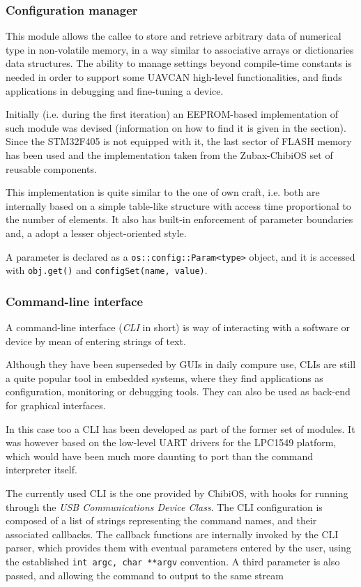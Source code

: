 \subsubsection{Configuration manager}
This module allows the callee to store and retrieve arbitrary data of numerical type in non-volatile memory, in a way similar to associative arrays or dictionaries data structures.
The ability to manage settings beyond compile-time constants is needed in order to support some UAVCAN high-level functionalities, and finds applications in debugging and fine-tuning a device.

Initially (i.e. during the first iteration) an EEPROM-based implementation of such module was devised (information on how to find it is given in the  section).
Since the STM32F405 is not equipped with it, the last sector of FLASH memory has been used and the implementation taken from the Zubax-ChibiOS set of reusable components.

This implementation is quite similar to the one of own craft, i.e. both are internally based on a simple table-like structure with access time proportional to the number of elements.
It also has built-in enforcement of parameter boundaries and, a adopt a lesser object-oriented style.

A parameter is declared as a \texttt{os::config::Param<type>} object, and it is accessed with \texttt{obj.get()} and \texttt{configSet(name, value)}.


\subsubsection{Command-line interface}
A command-line interface (\emph{CLI} in short) is way of interacting with a software or device by mean of entering strings of text.

Although they have been superseded by GUIs in daily compure use, CLIs are still a quite popular tool in embedded systems, where they find applications as configuration, monitoring or debugging tools.
They can also be used as back-end for graphical interfaces.

In this case too a CLI has been developed as part of the former set of modules.
It was however based on the low-level UART drivers for the LPC1549 platform, which would have been much more daunting to port than the command interpreter itself.

The currently used CLI is the one provided by ChibiOS, with hooks for running through the \emph{USB Communications Device Class}.
The CLI configuration is composed of a list of strings representing the command names, and their associated callbacks.
The callback functions are internally invoked by the CLI parser, which provides them with eventual parameters entered by the user, using the established \texttt{int argc, char **argv} convention.
A third parameter is also passed, and allowing the command to output to the same stream

